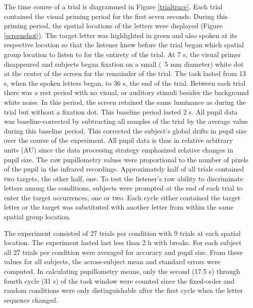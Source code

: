 \documentclass[10pt]{article}
\begin{document}
The time course of a trial is diagrammed in Figure \ref{trialtrace}.
Each trial contained the visual priming period for the first seven seconds.
During this priming period, the spatial locations of the letters
were displayed (Figure \ref{screenshot}).  The target letter was highlighted in
green and also spoken at its respective location so that the
listener knew before the trial began which spatial group location to
listen to for the entirety of the trial. At 7 s, the visual
primer disappeared and subjects began fixation on a small (~5 mm
diameter) white dot at the center of the screen for the remainder of
the trial.  The task lasted from 13 s, when the spoken letters
began, to 36 s, the end of the trial.  Between each trial there was a rest
period with no visual, or auditory stimuli besides the background
white noise.  In this period, the screen retained the same luminance
as during the trial but without a fixation dot. This baseline period
lasted 2 s.  All pupil data was baseline-corrected by
subtracting all samples of the trial by the average value during
this baseline period.  This corrected the subject's global drifts in pupil
size over the course of the experiment.  All pupil data is thus in relative arbitrary units
(AU) since the data processing strategy emphasized relative
changes in pupil size.  The raw pupillometry values were proportional
to the number of pixels of the pupil in the infrared recordings.
Approximately half of all trials contained two targets, the other
half, one. To test the listener's raw ability to discriminate letters
among the conditions, subjects were prompted at the end of each
trial to enter the target occurrences, one or two. Each cycle either
contained the target letter or the target was substituted with
another letter from within the same spatial group location.

The experiment consisted of 27 trials per condition
with 9 trials at each spatial location.  The experiment
lasted last less than 2 h with breaks.   For each
subject all 27 trials per condition were averaged for accuracy
and pupil size.  From these values for all subjects, the across-subject mean and
standard errors were computed.  In calculating pupillometry
means, only the second (17.5 s) through fourth cycle (31 s) of
the task window were counted since the fixed-order and random
conditions were only distinguishable after the first cycle
when the letter sequence changed.
\end{document}
